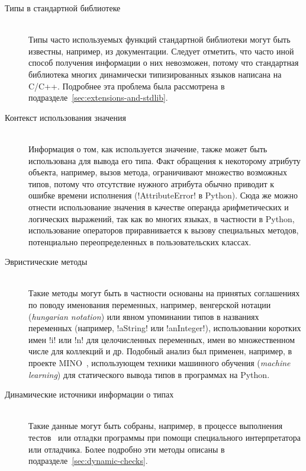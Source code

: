 \begin{description}
    \item[Типы в стандартной библиотеке] \hfill \\
        Типы часто используемых функций стандартной библиотеки могут быть
        известны, например, из документации. Следует отметить, что часто иной
        способ получения информации о них невозможен, потому что стандартная
        библиотека многих динамически типизированных языков написана на C/C++.
        Подробнее эта проблема была рассмотрена в
        подразделе~\ref{sec:extensions-and-stdlib}.

    \item[Контекст использования значения] \hfill \\
        Информация о том, как используется значение, также может быть
        использована для вывода его типа. Факт обращения к некоторому атрибуту
        объекта, например, вызов метода, ограничивают множество возможных
        типов, потому что отсутствие нужного атрибута обычно приводит к ошибке
        времени исполнения (!AttributeError! в Python).  Сюда же можно отнести
        использование значения в качестве операнда арифметических и логических
        выражений, так как во многих языках, в частности в Python, использование
        операторов приравнивается к вызову специальных методов, потенциально
        переопределенных в пользовательских классах.

    \item[Эвристические методы] \hfill \\
        Такие методы могут быть в частности основаны на принятых соглашениях по
        поводу именования переменных, например, венгерской нотации
        (\emph{hungarian notation}) или явном упоминании типов в названиях
        переменных (например, !aString! или !anInteger!),
        использовании коротких имен !i! или !n!  для целочисленных переменных,
        имен во множественном числе для коллекций и др. Подобный анализ был
        применен, например, в проекте MINO~\cite[]{Tu}, использующем техники
        машинного обучения (\emph{machine learning}) для статического вывода
        типов в программах на Python.

    \item[Динамические источники информации о типах] \hfill \\
        Такие данные могут быть собраны, например, в процессе выполнения
        тестов~\cite{Haupt2011} или отладки программы при помощи специального
        интерпретатора или отладчика. Более подробно эти методы описаны в
        подразделе~\ref{sec:dynamic-checks}.


\end{description}
